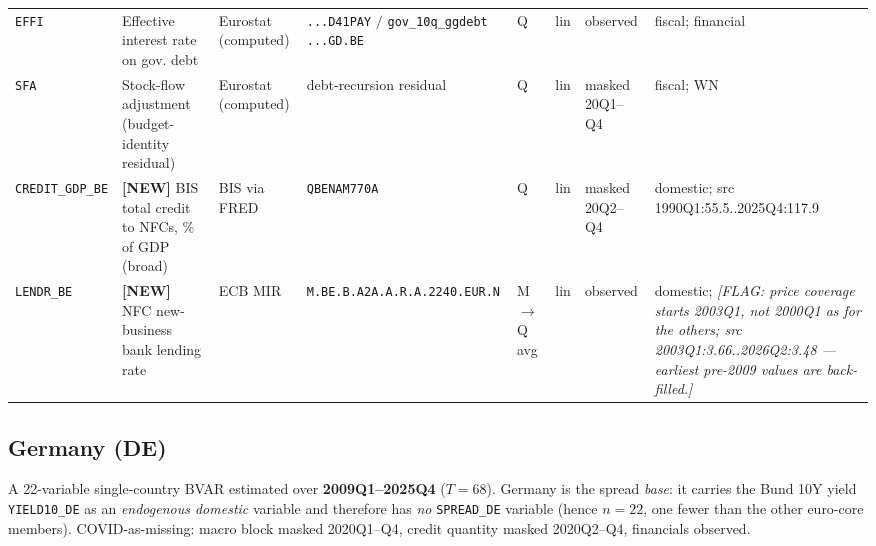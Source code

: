 \begin{longtable}{@{}p{}p{}p{}p{}p{}p{}p{}p{}@{}}
\texttt{EFFI}       & Effective interest rate on gov. debt & Eurostat (computed) & \texttt{...D41PAY} $/$ \texttt{gov\_10q\_ggdebt ...\allowbreak GD.\allowbreak BE} & Q & lin & observed & fiscal; financial \\
\texttt{SFA}        & Stock-flow adjustment (budget-identity residual) & Eurostat (computed) & debt-recursion residual & Q & lin & masked 20Q1--Q4 & fiscal; WN \\
\texttt{CREDIT\_GDP\_BE} & \textbf{[NEW]} BIS total credit to NFCs, \% of GDP (broad) & BIS via FRED & \texttt{QBENAM770A} & Q & lin & masked 20Q2--Q4 & domestic; src 1990Q1:55.5..\allowbreak 2025Q4:117.9 \\
\texttt{LENDR\_BE}  & \textbf{[NEW]} NFC new-business bank lending rate & ECB MIR & \texttt{M.\allowbreak BE.\allowbreak B.\allowbreak A2A.\allowbreak A.\allowbreak R.\allowbreak A.2240.\allowbreak EUR.\allowbreak N} & M$\to$Q avg & lin & observed & domestic; \textit{[FLAG: price coverage starts 2003Q1, not 2000Q1 as for the others; src 2003Q1:3.66..\allowbreak 2026Q2:3.48 — earliest pre-2009 values are back-filled.]} \\
\end{longtable}

\subsection{Germany (DE)}
\label{sec:data:DE}

A 22-variable single-country BVAR estimated over \textbf{2009Q1--2025Q4}
($T=68$). Germany is the spread \emph{base}: it carries the Bund 10Y yield
\texttt{YIELD10\_DE} as an \emph{endogenous domestic} variable and therefore has
\emph{no} \texttt{SPREAD\_DE} variable (hence $n=22$, one fewer than the other
euro-core members). COVID-as-missing: macro block masked 2020Q1--Q4, credit
quantity masked 2020Q2--Q4, financials observed.

